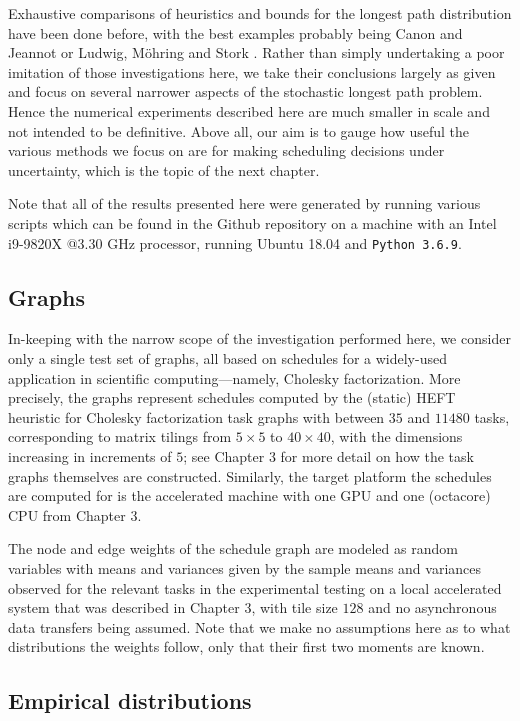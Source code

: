 \documentclass[12pt]{article}
\begin{document}
Exhaustive comparisons of heuristics and bounds for the longest path distribution have been done before, with the best examples probably being Canon and Jeannot \cite{can16} or Ludwig, M{\"o}hring and Stork \cite{lud01}. Rather than simply undertaking a poor imitation of those investigations here, we take their conclusions largely as given and focus on several narrower aspects of the stochastic longest path problem. Hence the numerical experiments described here are much smaller in scale and not intended to be definitive. Above all, our aim is to gauge how useful the various methods we focus on are for making scheduling decisions under uncertainty, which is the topic of the next chapter.

Note that all of the results presented here were generated by running various scripts which can be found in the Github repository on a machine with an Intel i9-9820X @3.30 GHz processor, running Ubuntu 18.04 and {\tt Python 3.6.9}. 

\subsection{Graphs}
\label{subsect.graphs}

In-keeping with the narrow scope of the investigation performed here, we consider only a single test set of graphs, all based on schedules for a widely-used application in scientific computing---namely, Cholesky factorization. More precisely, the graphs represent schedules computed by the (static) HEFT heuristic for Cholesky factorization task graphs with between $35$ and $11480$ tasks, corresponding to matrix tilings from $5 \times 5$ to $40 \times 40$, with the dimensions increasing in increments of $5$; see Chapter 3 for more detail on how the task graphs themselves are constructed. Similarly, the target platform the schedules are computed for is the accelerated machine with one GPU and one (octacore) CPU from Chapter 3.

The node and edge weights of the schedule graph are modeled as random variables with means and variances given by the sample means and variances observed for the relevant tasks in the experimental testing on a local accelerated system that was described in Chapter 3, with tile size $128$ and no asynchronous data transfers being assumed. Note that we make no assumptions here as to what distributions the weights follow, only that their first two moments are known.  

\subsection{Empirical distributions}
\label{subsect.empirical_distribution}
\end{document}
